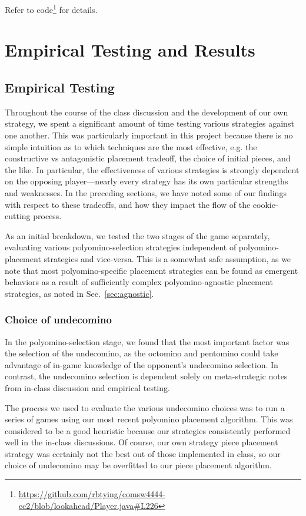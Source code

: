 \documentclass{scrartcl}
\begin{document}
Refer to code\footnote{\url{https://github.com/rbtying/comsw4444-cc2/blob/lookahead/Player.java\#L226}} for details.


\section{Empirical Testing and Results} %

\subsection{Empirical Testing}
Throughout the course of the class discussion and the development of our own strategy, we spent a significant amount of time testing various strategies against one another. This was particularly important in this project because there is no simple intuition as to which techniques are the most effective, e.g. the constructive vs antagonistic placement tradeoff, the choice of initial pieces, and the like. In particular, the effectiveness of various strategies is strongly dependent on the opposing player---nearly every strategy has its own particular strengths and weaknesses. In the preceding sections, we have noted some of our findings with respect to these tradeoffs, and how they impact the flow of the cookie-cutting process.

As an initial breakdown, we tested the two stages of the game separately, evaluating various polyomino-selection strategies independent of polyomino-placement strategies and vice-versa. This is a somewhat safe assumption, as we note that most polyomino-specific placement strategies can be found as emergent behaviors as a result of sufficiently complex polyomino-agnostic placement strategies, as noted in Sec.~\ref{sec:agnostic}.

\subsubsection{Choice of undecomino}\label{sec:undecomino}
In the polyomino-selection stage, we found that the most important factor was the selection of the undecomino, as the octomino and pentomino could take advantage of in-game knowledge of the opponent's undecomino selection. In contrast, the undecomino selection is dependent solely on meta-strategic notes from in-class discussion and empirical testing.

The process we used to evaluate the various undecomino choices was to run a series of games using our most recent polyomino placement algorithm. This was considered to be a good heuristic because our strategies consistently performed well in the in-class discussions. Of course, our own strategy piece placement strategy was certainly not the best out of those implemented in class, so our choice of undecomino may be overfitted to our piece placement algorithm.
\end{document}
